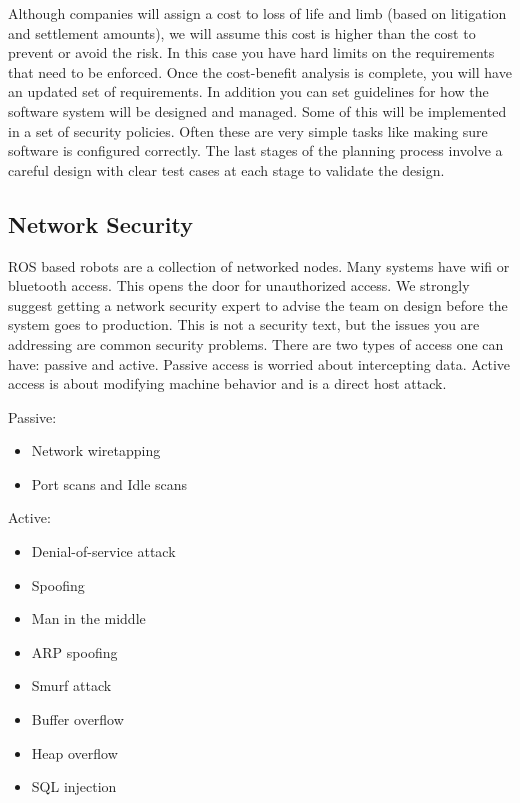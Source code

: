 Although companies will assign a cost to loss of life and limb (based on
litigation and settlement amounts), we will assume this cost is higher
than the cost to prevent or avoid the risk. In this case you have hard
limits on the requirements that need to be enforced. Once the
cost-benefit analysis is complete, you will have an updated set of
requirements. In addition you can set guidelines for how the software
system will be designed and managed. Some of this will be implemented in
a set of security policies. Often these are very simple tasks like
making sure software is configured correctly. The last stages of the
planning process involve a careful design with clear test cases at each
stage to validate the design.

\hypertarget{network-security}{%
\subsection{Network Security}\label{network-security}}

ROS based robots are a collection of networked nodes. Many systems have
wifi or bluetooth access. This opens the door for unauthorized access.
We strongly suggest getting a network security expert to advise the team
on design before the system goes to production. This is not a security
text, but the issues you are addressing are common security problems.
There are two types of access one can have: passive and active. Passive
access is worried about intercepting data. Active access is about
modifying machine behavior and is a direct host attack.

Passive:

\begin{itemize}
\tightlist
\item
  Network wiretapping
\item
  Port scans and Idle scans
\end{itemize}

Active:

\begin{itemize}
\tightlist
\item
  Denial-of-service attack
\item
  Spoofing
\item
  Man in the middle
\item
  ARP spoofing
\item
  Smurf attack
\item
  Buffer overflow
\item
  Heap overflow
\item
  SQL injection
\end{itemize}

